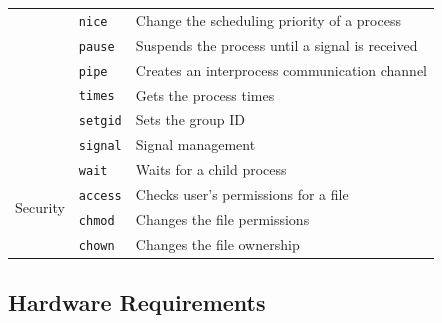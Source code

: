 \documentclass[10pt,a4paper]{article}
\begin{document}
\begin{table}[b]
\begin{tabular}{l l l}
	                                     & \texttt{nice}     & Change the scheduling priority of a process         \\
	                                     & \texttt{pause}    & Suspends the process until a signal is received     \\
	                                     & \texttt{pipe}     & Creates an interprocess communication channel       \\
	                                     & \texttt{times}    & Gets the process times                              \\
	                                     & \texttt{setgid}   & Sets the group ID                                   \\
	                                     & \texttt{signal}   & Signal management                                   \\
	                                     & \texttt{wait}     & Waits for a child process                           \\
	\midrule
	\multirow{2}{*}{Security}            & \texttt{access}   & Checks user's permissions for a file                \\
	                                     & \texttt{chmod}    & Changes the file permissions                        \\
	                                     & \texttt{chown}    & Changes the file ownership                          \\
	\bottomrule
\end{tabular}
\end{table}


\subsection{Hardware Requirements}
\label{section: hardware requirements}
\end{document}
